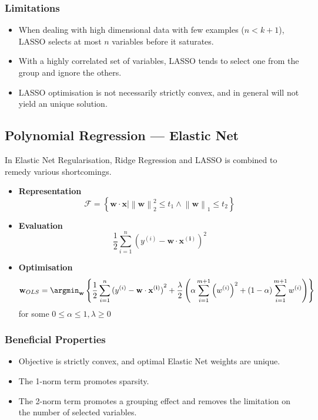 \subsubsection{Limitations}
\begin{itemize}
  \item When dealing with high dimensional data with few examples ($n<k+1$), LASSO
  selects at most $n$ variables before it saturates.
  \item With a highly correlated set of variables, LASSO tends to select one from the group and 
  ignore the others.
  \item LASSO optimisation is not necessarily strictly convex, and in general will not
  yield an unique solution.
\end{itemize}

\subsection{Polynomial Regression --- Elastic Net}
In Elastic Net Regularisation, Ridge Regression and LASSO is combined to remedy
various shortcomings.
\begin{itemize}
  \item \textbf{Representation} \[\mathcal{F}=\left\{ \mathbf{w\cdot x}|{\left\lVert \mathbf{w} \right\rVert}_2^2\le t_1 \wedge\left\lVert \mathbf{w} \right\rVert_1 \le t_2\right\}\]
  \item \textbf{Evaluation} \[\frac{1}{2}\sum_{i=1}^{n} {(y^{(i)}-\mathbf{w\cdot x^{(i)}})}^{2}\]
  \item \textbf{Optimisation} \[\mathbf{w}_{OLS}=\argmin_\mathbf{w}\left\{
  \frac{1}{2}\sum_{i=1}^{n} {(y^{(i)}-\mathbf{w\cdot x^{(i)}})}^{2} +\frac{\lambda}{2}\left( \alpha \sum_{i=1}^{m+1} {\left(w^{(i)}\right)}^2+(1-\alpha)\sum_{i=1}^{m+1} w^{(i)} \right) \right\}\]
  for some $0\le \alpha\le 1,\lambda\ge 0$
\end{itemize}
\subsubsection{Beneficial Properties}
\begin{itemize}
  \item Objective is strictly convex, and optimal Elastic Net weights are unique.
  \item The 1-norm term promotes sparsity.
  \item The 2-norm term promotes a grouping effect and removes the limitation
    on the number of selected variables.
\end{itemize}
